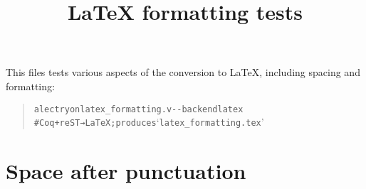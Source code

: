 \documentclass[a4paper]{article}
\begin{document}
\title{LaTeX formatting tests%
  \label{latex-formatting-tests}}
\author{}
\date{}
\maketitle

This files tests various aspects of the conversion to LaTeX, including spacing and formatting:

\begin{quote}
\begin{alltt}
alectryon latex_formatting.v -{}-backend latex
  # Coq+reST → LaTeX; produces ‘latex_formatting.tex’
\end{alltt}
\end{quote}

\setlength{\parskip}{8pt}


\section{Space after punctuation%
  \label{space-after-punctuation}%
}
\end{document}
